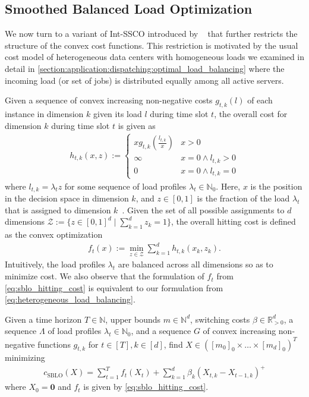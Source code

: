 \subsection{Smoothed Balanced Load Optimization}

We now turn to a variant of Int-SSCO introduced by \citeauthor*{Albers2021_2}~\cite{Albers2021_2} that further restricts the structure of the convex cost functions. This restriction is motivated by the usual cost model of heterogeneous data centers with homogeneous loads we examined in detail in \cref{section:application:dispatching:optimal_load_balancing} where the incoming load (or set of jobs) is distributed equally among all active servers.

Given a sequence of convex increasing non-negative costs $g_{t,k}(l)$ of each instance in dimension $k$ given its load $l$ during time slot $t$, the overall cost for dimension $k$ during time slot $t$ is given as \begin{align*}
    h_{t,k}(x,z) := \begin{cases}
        x g_{t,k}\left(\frac{l_{t,k}}{x}\right) & x > 0 \\
        \infty                                  & x = 0 \land l_{t,k} > 0 \\
        0                                       & x = 0 \land l_{t,k} = 0
    \end{cases}
\end{align*} where $l_{t,k} = \lambda_t z$ for some sequence of load profiles $\lambda_t \in \mathbb{N}_0$. Here, $x$ is the position in the decision space in dimension $k$, and $z \in [0,1]$ is the fraction of the load $\lambda_t$ that is assigned to dimension $k$~\cite{Albers2021_2}. Given the set of all possible assignments to $d$ dimensions $\mathcal{Z} := \{z \in [0,1]^d \mid \sum_{k=1}^d z_k = 1\}$, the overall hitting cost is defined as the convex optimization \begin{align}
\label{eq:sblo_hitting_cost}
    f_t(x) := \min_{z \in \mathcal{Z}} \sum_{k=1}^d h_{t,k}(x_k,z_k).
\end{align} Intuitively, the load profiles $\lambda_t$ are balanced across all dimensions so as to minimize cost. We also observe that the formulation of $f_t$ from \cref{eq:sblo_hitting_cost} is equivalent to our formulation from \cref{eq:heterogeneous_load_balancing}.

\begin{problem}\label{problem:sblo}
Given a time horizon $T \in \mathbb{N}$, upper bounds $m \in \mathbb{N}^d$, switching costs $\beta \in \mathbb{R}_{>0}^d$, a sequence $\Lambda$ of load profiles $\lambda_t \in \mathbb{N}_0$, and a sequence $G$ of convex increasing non-negative functions $g_{t,k}$ for $t \in [T], k \in [d]$, find $X \in ([m_0]_0 \times \dots \times [m_d]_0)^T$ minimizing \begin{align*}
    c_{\text{SBLO}}(X) = \sum_{t=1}^T f_t(X_t) + \sum_{k=1}^d \beta_k (X_{t,k} - X_{t-1,k})^+
\end{align*}
where $X_0 = \mathbf{0}$ and $f_t$ is given by \cref{eq:sblo_hitting_cost}.
\end{problem}

